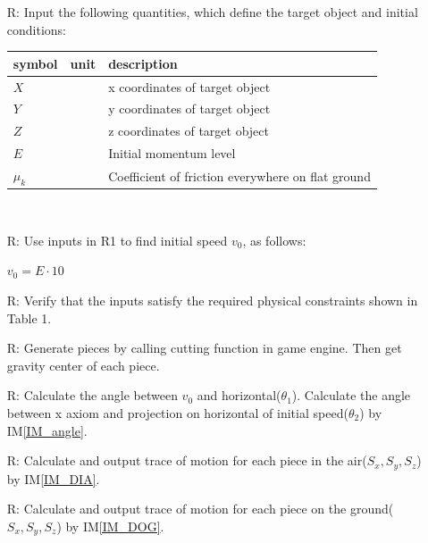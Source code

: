 \documentclass[12pt]{article}
\newcounter{reqnum} %
\begin{document}
	\noindent \begin{itemize}
		
		\item[R\refstepcounter{reqnum}\thereqnum \label{R_Inputs}:] 
		Input the following quantities, which define the target object
		and initial conditions:
		\noindent \begin{longtable*}{l l l} 
			\toprule
			\textbf{symbol} & \textbf{unit} & \textbf{description}\\
			\midrule 
			$X$ & & x coordinates of target object
			\\
			$Y$ & & y coordinates of target object
			\\
			$Z$ & & z coordinates of target object
			\\
			$E$ & & Initial momentum level
			\\
			$\mu_{k}$ & & Coefficient of friction everywhere on flat ground
			\\
			\bottomrule
		\end{longtable*}
		
		~\newpage
		
		\item[R\refstepcounter{reqnum}\thereqnum \label{R_InitialSpeed}:] Use inputs in R1 to find initial speed $v_{0}$, as follows:
		
		$v_{0}=E \cdot 10$
		
		\item[R\refstepcounter{reqnum}\thereqnum \label{R_VerifyOutput}:] Verify that the inputs satisfy the required physical constraints shown in Table 1.
		
		\item[R\refstepcounter{reqnum}\thereqnum \label{R_Piece}:] Generate pieces by calling cutting function in game engine. Then get gravity center of each piece.
		
		\item[R\refstepcounter{reqnum}\thereqnum \label{R_Calculate}:]
		Calculate the angle between $v_{0}$ and horizontal($\theta _{1}$). Calculate the angle between x axiom and projection on horizontal of initial speed($\theta _{2}$) by IM\ref{IM_angle}. 
		
		\item[R\refstepcounter{reqnum}\thereqnum \label{R_Output1}:] 
		Calculate and output trace of motion for each piece in the air($S_{x},S_{y},S_{z}$) by IM\ref{IM_DIA}.
		
		\item[R\refstepcounter{reqnum}\thereqnum \label{R_Output2}:] 
		Calculate and output trace of motion for each piece on the ground($S_{x},S_{y},S_{z}$) by IM\ref{IM_DOG}.
		
	\end{itemize}
	
\end{document}
